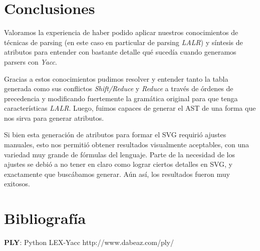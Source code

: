 \section{Conclusiones}

Valoramos la experiencia de haber podido aplicar nuestros conocimientos de técnicas de parsing (en este caso en particular de parsing \emph{LALR}) y síntesis de atributos para entender con bastante detalle qué sucedía cuando generamos parsers con \emph{Yacc}. 

Gracias a estos conocimientos pudimos resolver y entender tanto la tabla generada como sus conflictos \emph{Shift/Reduce} y \emph{Reduce} a través de órdenes de precedencia y modificando fuertemente la gramática original para que tenga características \emph{LALR}. \newline
Luego, fuimos capaces de generar el AST de una forma que nos sirva para generar atributos.

Si bien esta generación de atributos para formar el SVG requirió ajustes manuales, esto nos permitió obtener resultados visualmente aceptables, con una variedad muy grande de fórmulas del lenguaje. Parte de la necesidad de los ajustes se debió a no tener en claro como lograr ciertos detalles en SVG, y exactamente que buscábamos generar. Aún así, los resultados fueron muy exitosos. 

\section{Bibliografía}


\begin{thebibliography}{9}

	\textbf{PLY}: Python LEX-Yacc 
	http://www.dabeaz.com/ply/
  

\end{thebibliography}
